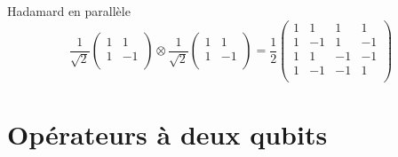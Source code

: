 \documentclass[aspectratio=169,12pt]{beamer}
\begin{document}
\begin{frame}{Hadamard en parallèle}
  \begin{equation*}
    \frac{1}{\sqrt{2}}
    \begin{pmatrix}
      1 &  1 \\
      1 & -1 \\
    \end{pmatrix}
    \otimes
    \frac{1}{\sqrt{2}}
    \begin{pmatrix}
      1 &  1 \\
      1 & -1 \\
    \end{pmatrix}
    = 
    \frac{1}{2}
    \begin{pmatrix}
      1 &  1 &  1 &  1 \\
      1 & -1 &  1 & -1 \\
      1 &  1 & -1 & -1 \\
      1 & -1 & -1 &  1 \\
    \end{pmatrix}
  \end{equation*}
\end{frame}

\section{Opérateurs à deux qubits}
\end{document}
